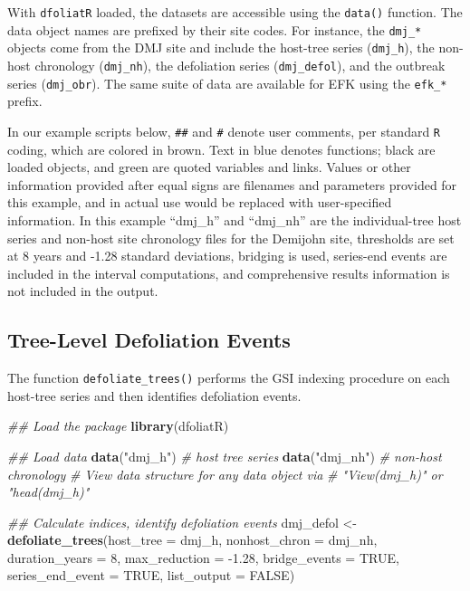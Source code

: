 \documentclass[review]{elsarticle} %
\newenvironment{Shaded}{\begin{snugshade}}{\end{snugshade}}
\newcommand{\CommentTok}[1]{\textcolor[rgb]{0.56,0.35,0.01}{\textit{#1}}}
\newcommand{\DataTypeTok}[1]{\textcolor[rgb]{0.13,0.29,0.53}{#1}}
\newcommand{\DecValTok}[1]{\textcolor[rgb]{0.00,0.00,0.81}{#1}}
\newcommand{\FloatTok}[1]{\textcolor[rgb]{0.00,0.00,0.81}{#1}}
\newcommand{\KeywordTok}[1]{\textcolor[rgb]{0.13,0.29,0.53}{\textbf{#1}}}
\newcommand{\NormalTok}[1]{#1}
\newcommand{\OtherTok}[1]{\textcolor[rgb]{0.56,0.35,0.01}{#1}}
\newcommand{\StringTok}[1]{\textcolor[rgb]{0.31,0.60,0.02}{#1}}
\begin{document}
With \texttt{dfoliatR} loaded, the datasets are accessible using the \texttt{data()} function. The data object names are prefixed by their site codes. For instance, the \texttt{dmj\_*} objects come from the DMJ site and include the host-tree series (\texttt{dmj\_h}), the non-host chronology (\texttt{dmj\_nh}), the defoliation series (\texttt{dmj\_defol}), and the outbreak series (\texttt{dmj\_obr}). The same suite of data are available for EFK using the \texttt{efk\_*} prefix.

In our example scripts below, \texttt{\#\#} and \texttt{\#} denote user comments, per standard \texttt{R} coding, which are colored in brown. Text in blue denotes functions; black are loaded objects, and green are quoted variables and links. Values or other information provided after equal signs are filenames and parameters provided for this example, and in actual use would be replaced with user-specified information. In this example ``dmj\_h'' and ``dmj\_nh'' are the individual-tree host series and non-host site chronology files for the Demijohn site, thresholds are set at 8 years and -1.28 standard deviations, bridging is used, series-end events are included in the interval computations, and comprehensive results information is not included in the output.

\hypertarget{tree-level-defoliation-events}{%
\subsection{Tree-Level Defoliation Events}\label{tree-level-defoliation-events}}

The function \texttt{defoliate\_trees()} performs the GSI indexing procedure on each host-tree series and then identifies defoliation events.

\begin{Shaded}
\begin{Highlighting}[]
\CommentTok{## Load the package}
\KeywordTok{library}\NormalTok{(dfoliatR)}

\CommentTok{## Load data}
\KeywordTok{data}\NormalTok{(}\StringTok{"dmj_h"}\NormalTok{) }\CommentTok{# host tree series}
\KeywordTok{data}\NormalTok{(}\StringTok{"dmj_nh"}\NormalTok{) }\CommentTok{# non-host chronology}
\CommentTok{# View data structure for any data object via }
\CommentTok{# "View(dmj_h)" or "head(dmj_h)"}

\CommentTok{## Calculate indices, identify defoliation events}
\NormalTok{dmj_defol <-}\StringTok{ }\KeywordTok{defoliate_trees}\NormalTok{(}\DataTypeTok{host_tree =}\NormalTok{ dmj_h,}
                             \DataTypeTok{nonhost_chron =}\NormalTok{ dmj_nh,}
                             \DataTypeTok{duration_years =} \DecValTok{8}\NormalTok{,  }
                             \DataTypeTok{max_reduction =} \FloatTok{-1.28}\NormalTok{, }
                             \DataTypeTok{bridge_events =} \OtherTok{TRUE}\NormalTok{, }
                             \DataTypeTok{series_end_event =} \OtherTok{TRUE}\NormalTok{, }
                             \DataTypeTok{list_output =} \OtherTok{FALSE}\NormalTok{) }
\end{Highlighting}
\end{Shaded}
\end{document}
